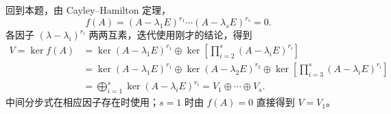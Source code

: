 \documentclass[11pt,fontset=fandol]{ctexart}
\begin{document}
回到本题，由 Cayley--Hamilton 定理， \[
f(A)=(A-\lambda_1E)^{r_1}\cdots(A-\lambda_sE)^{r_s}=0.
\] 各因子 \((\lambda-\lambda_i)^{r_i}\)
两两互素，迭代使用刚才的结论，得到 \[
\begin{aligned}
V=\ker f(A)
&=\ker(A-\lambda_1E)^{r_1}\oplus
\ker\left[\prod_{i=2}^s(A-\lambda_iE)^{r_i}\right]\\
&=\ker(A-\lambda_1E)^{r_1}\oplus\ker(A-\lambda_2E)^{r_2}
\oplus\ker\left[\prod_{i=3}^s(A-\lambda_iE)^{r_i}\right]\\
&=\bigoplus_{i=1}^s\ker(A-\lambda_iE)^{r_i}
=V_1\oplus\cdots\oplus V_s.
\end{aligned}
\] 中间分步式在相应因子存在时使用；\(s=1\) 时由 \(f(A)=0\) 直接得到
\(V=V_1\)。
\end{document}
